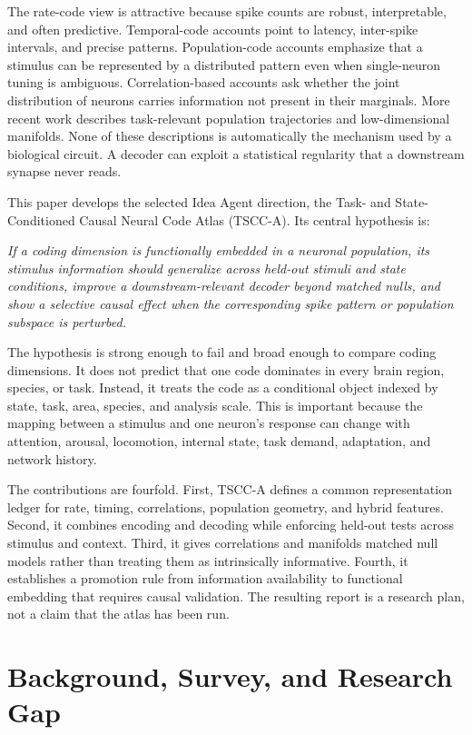 \documentclass[conference]{IEEEtran}
\begin{document}
The rate-code view is attractive because spike counts are robust, interpretable, and often predictive. Temporal-code accounts point to latency, inter-spike intervals, and precise patterns. Population-code accounts emphasize that a stimulus can be represented by a distributed pattern even when single-neuron tuning is ambiguous. Correlation-based accounts ask whether the joint distribution of neurons carries information not present in their marginals. More recent work describes task-relevant population trajectories and low-dimensional manifolds. None of these descriptions is automatically the mechanism used by a biological circuit. A decoder can exploit a statistical regularity that a downstream synapse never reads.

This paper develops the selected Idea Agent direction, the Task- and State-Conditioned Causal Neural Code Atlas (TSCC-A). Its central hypothesis is:

\emph{If a coding dimension is functionally embedded in a neuronal population, its stimulus information should generalize across held-out stimuli and state conditions, improve a downstream-relevant decoder beyond matched nulls, and show a selective causal effect when the corresponding spike pattern or population subspace is perturbed.}

The hypothesis is strong enough to fail and broad enough to compare coding dimensions. It does not predict that one code dominates in every brain region, species, or task. Instead, it treats the code as a conditional object indexed by state, task, area, species, and analysis scale. This is important because the mapping between a stimulus and one neuron's response can change with attention, arousal, locomotion, internal state, task demand, adaptation, and network history.

The contributions are fourfold. First, TSCC-A defines a common representation ledger for rate, timing, correlations, population geometry, and hybrid features. Second, it combines encoding and decoding while enforcing held-out tests across stimulus and context. Third, it gives correlations and manifolds matched null models rather than treating them as intrinsically informative. Fourth, it establishes a promotion rule from information availability to functional embedding that requires causal validation. The resulting report is a research plan, not a claim that the atlas has been run.

\section{Background, Survey, and Research Gap}
\end{document}
